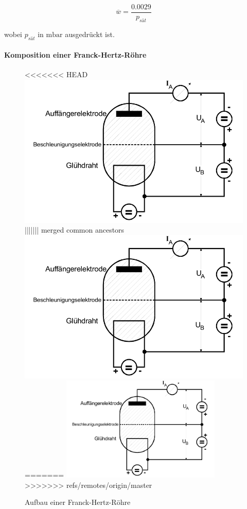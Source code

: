 \begin{equation}
  \label{eqn:Weg}
  \overline{w} = \frac{0.0029}{p_{sät}}
\end{equation}

wobei $p_{sät}$ in $\si{\milli \bar}$ ausgedrückt ist.

\paragraph{Komposition einer Franck-Hertz-Röhre}
\begin{figure}
  \center
<<<<<<< HEAD
  \includegraphics[width=\textwidth]{./logos/roehre.PNG}
||||||| merged common ancestors
  \includegraphics[width=\textwidth]{./logos/roehre.png}
=======
  \includegraphics[height = 5cm]{./logos/roehre.png}
>>>>>>> refs/remotes/origin/master
  \caption{Aufbau einer Franck-Hertz-Röhre \cite{Anleitung}}
  \label{fig:roehre}
\end{figure}

